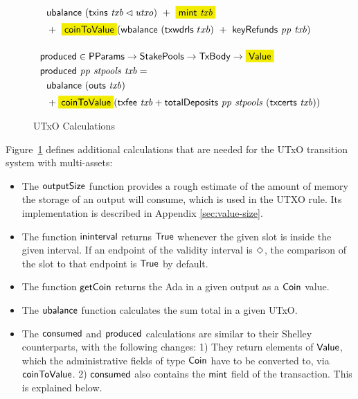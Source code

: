 \begin{figure}[htb]
\begin{align*}
    & ~~\ubalance{(\txins{txb} \restrictdom \var{utxo})} ~+~ \hldiff{\fun{mint}~\var{txb}} \\
    &~~+~\hldiff{\fun{coinToValue}}(\fun{wbalance}~(\fun{txwdrls}~{txb})~+~ \keyRefunds{pp}{txb})
    \nextdef
    & \fun{produced} \in \PParams \to \StakePools \to \TxBody \to \hldiff{\Value} \\
    & \fun{produced}~\var{pp}~\var{stpools}~\var{txb} = \\
    &~~\ubalance{(\fun{outs}~{txb})} \\
    &~~+ \hldiff{\fun{coinToValue}}(\txfee{txb} + \totalDeposits{pp}{stpools}{(\txcerts{txb})})
  \end{align*}
  \caption{UTxO Calculations}
  \label{fig:functions:utxo}
\end{figure}

Figure~\ref{fig:functions:utxo} defines additional calculations that are needed for the
UTxO transition system with multi-assets:

\begin{itemize}

  \item The $\mathsf{outputSize}$ function provides a rough estimate of
    the amount of memory the storage of an output will consume, which is used in the UTXO rule.
    Its implementation is described in Appendix \ref{sec:value-size}.

  \item The function $\mathsf{ininterval}$ returns $\mathsf{True}$ whenever the given slot is
  inside the given interval. If an endpoint of the validity interval
  is $\Diamond$, the comparison of the slot to that endpoint is $\mathsf{True}$ by default.

  \item The function $\mathsf{getCoin}$ returns the Ada in a given output as a $\mathsf{Coin}$ value.

  \item The $\mathsf{ubalance}$ function calculates the sum total in a given UTxO.

  \item The $\mathsf{consumed}$ and $\mathsf{produced}$ calculations are similar to their Shelley
    counterparts, with the following changes: 1) They return elements of $\mathsf{Value}$, which
    the administrative fields of type $\mathsf{Coin}$ have to be converted to, via $\mathsf{coinToValue}$.
    2) $\mathsf{consumed}$ also contains the $\mathsf{mint}$ field of the transaction.
    This is explained below.
\end{itemize}

